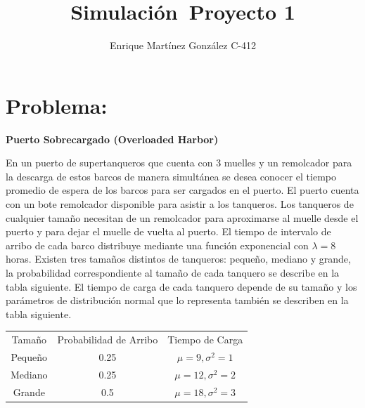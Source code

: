 \documentclass[titlepage,11pt]{scrartcl}
\title{	
    \normalfont\normalsize
	\vspace{25pt}
	{\huge Simulación\ Proyecto 1}
	\vspace{12pt}
}
\author{\LARGE Enrique Martínez González C-412}
\date{}
\begin{document}
\maketitle

\section{Problema:}

	\textbf{Puerto Sobrecargado (Overloaded Harbor)}

	En un puerto de supertanqueros que cuenta con 3 muelles y un remolcador para la descarga de estos barcos de manera simultánea se desea conocer el tiempo promedio de espera de los barcos para ser cargados en el puerto. El puerto cuenta con un bote remolcador disponible para asistir a los tanqueros. Los tanqueros de cualquier tamaño necesitan de un remolcador para aproximarse al muelle desde el puerto y para dejar el muelle de vuelta al puerto. El tiempo de intervalo de arribo de cada barco distribuye mediante una función exponencial con $\lambda = 8$ horas. Existen tres tamaños distintos de tanqueros: pequeño, mediano y grande, la probabilidad correspondiente al tamaño de cada tanquero se describe en la tabla siguiente. El tiempo de carga de cada tanquero depende de su tamaño y los parámetros de distribución normal que lo representa también se describen en la tabla siguiente.

	\begin{center}
		\begin{tabular}
			{c c c}
			\rule[-1ex]{0pt}{1.5ex} Tamaño & Probabilidad de Arribo & Tiempo de Carga \\
			\rule[-1ex]{0pt}{1.5ex} Pequeño & 0.25 & $\mu = 9, \sigma^2 = 1$ \\
			\rule[-1ex]{0pt}{1.5ex} Mediano & 0.25 & $\mu = 12, \sigma^2 = 2$ \\
			\rule[-1ex]{0pt}{1.5ex} Grande & 0.5 & $\mu = 18, \sigma^2 = 3$ \\
		\end{tabular}
	\end{center}
\end{document}

